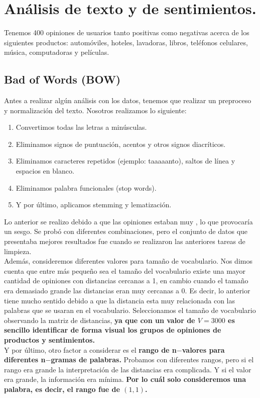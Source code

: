 \documentclass[paper=letter, fontsize=11pt]{scrartcl}
\numberwithin{equation}{section} %
\numberwithin{figure}{section} %
\numberwithin{table}{section} %
\begin{document}
\section{Análisis de texto y de sentimientos.}
Tenemos 400 opiniones de usuarios tanto positivas como negativas acerca de los siguientes productos: automóviles, hoteles, lavadoras, libros, teléfonos celulares, música, computadoras y películas.

\subsection{Bad of Words (BOW)}
Antes a realizar algún análisis con los datos, tenemos que realizar un preproceso y normalización del texto. Nosotros realizamos lo siguiente:
\begin{enumerate}
    \item Convertimos todas las letras a minúsculas.
    \item Eliminamos signos de puntuación, acentos y otros signos diacríticos.
    \item Eliminamos caracteres repetidos (ejemplo: taaaaanto), saltos de línea y espacios en blanco.
    \item Eliminamos palabra funcionales (stop words).
    \item Y por último, aplicamos stemming y lematización. 
\end{enumerate}
Lo anterior se realizo debido a que las opiniones estaban muy , lo que provocaría un sesgo. Se probó con diferentes combinaciones, pero el conjunto de datos que presentaba mejores resultados fue cuando se realizaron las anteriores tareas de limpieza.\\

Además, consideremos diferentes valores para tamaño de vocabulario. Nos dimos cuenta que entre más pequeño sea el tamaño del vocabulario existe una mayor cantidad de opiniones con distancias cercanas a 1, en cambio cuando el tamaño era demasiado grande las distancias eran muy cercanas a 0. Es decir, lo anterior tiene mucho sentido debido a que la distancia esta muy relacionada con las palabras que se usaran en el vocabulario. Seleccionamos el tamaño de vocabulario observando la matriz de distancias, \textbf{ya que con un valor de $V=3000$ es sencillo identificar de forma visual los grupos de opiniones de productos y sentimientos.}\\

Y por último, otro factor a considerar es el \textbf{rango de n$-$valores para diferentes n$-$gramas de palabras.} Probamos con diferentes rangos, pero si el rango era grande la interpretación de las distancias era complicada. Y si el valor era grande, la información era mínima. \textbf{Por lo cuál solo consideremos una palabra, es decir, el rango fue de $(1,1)$.}
\end{document}
